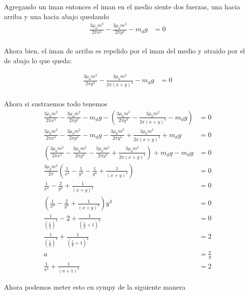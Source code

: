 \documentclass{report}
\begin{document}
\section{}

Agregando un iman entonces el iman en el medio siente dos fuerzas, una hacia arriba y una hacia abajo quedando
\begin{align*}
  \frac{3\mu_0 m^2}{2\pi x^4} -\frac{3\mu_0 m^2}{2\pi y^4} - m_d g &= 0\\
\end{align*}

Ahora bien, el iman de arriba es repelido por el iman del medio y atraido por el de abajo lo que queda:

\begin{align*}
  \frac{3\mu_0 m^2}{2\pi y^4} -\frac{3\mu_0 m^2}{2\pi (x + y)^4} - m_d g &= 0\\
\end{align*}

Ahora si sustraemos todo tenemos
\begin{align*}
  \frac{3\mu_0 m^2}{2\pi x^4} -\frac{3\mu_0 m^2}{2\pi y^4} - m_d g  - \left(\frac{3\mu_0 m^2}{2\pi y^4} -\frac{3\mu_0 m^2}{2\pi (x + y)^4} - m_d g\right) &= 0\\
  \frac{3\mu_0 m^2}{2\pi x^4} -\frac{3\mu_0 m^2}{2\pi y^4} - m_d g  - \frac{3\mu_0 m^2}{2\pi y^4} + \frac{3\mu_0 m^2}{2\pi (x + y)^4} + m_d g &= 0\\
  \left(\frac{3\mu_0 m^2}{2\pi x^4} -\frac{3\mu_0 m^2}{2\pi y^4}   - \frac{3\mu_0 m^2}{2\pi y^4} + \frac{3\mu_0 m^2}{2\pi (x + y)^4}\right) + m_d g - m_d g &= 0\\
  \frac{3\mu_0 m^2}{2\pi} \left(\frac{1}{x^4} -\frac{1}{y^4}   - \frac{1}{y^4} + \frac{1}{(x + y)^4}\right) &= 0\\
  \frac{1}{x^4} - \frac{2}{y^4} + \frac{1}{(x + y)^4} &= 0\\
  \left(\frac{1}{x^4} - \frac{2}{y^4} + \frac{1}{(x + y)^4}\right)y^{4} &= 0\\
  \frac{1}{\left(\frac{x}{y}\right)^4} - 2 + \frac{1}{\left(\frac{x}{y} + 1\right)^4} &= 0\\
  \frac{1}{\left(\frac{x}{y}\right)^4} + \frac{1}{\left(\frac{x}{y} + 1\right)^4} &= 2\\
  a &= \frac{x}{y}\\
  \frac{1}{a^4} + \frac{1}{\left(a + 1\right)^4} &= 2
\end{align*}

Ahora podemos meter esto en sympy de la siguiente manera
\end{document}
